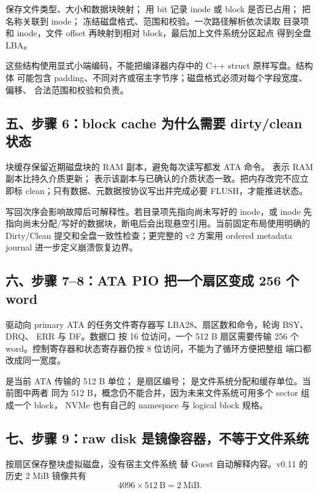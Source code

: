 保存文件类型、大小和数据块映射；
用 bit 记录 inode 或 block 是否已占用；
把名称关联到 inode；
冻结磁盘格式、范围和校验。一次路径解析依次读取
目录项和 inode，文件 offset 再映射到相对 block，最后加上文件系统分区起点
得到全盘 LBA。

这些结构使用显式小端编码，不能把编译器内存中的 C++ struct 原样写盘。结构体
可能包含 padding、不同对齐或宿主字节序；磁盘格式必须对每个字段宽度、偏移、
合法范围和校验和负责。

\subsection{五、步骤 6：block cache 为什么需要 dirty/clean 状态}

块缓存保留近期磁盘块的 RAM 副本，避免每次读写都发 ATA 命令。
表示 RAM 副本比持久介质更新；
表示该副本与已确认的介质状态一致。把内存改完不应立即标
clean；只有数据、元数据按协议写出并完成必要 FLUSH，才能推进状态。

写回次序会影响故障后可解释性。若目录项先指向尚未写好的 inode，或 inode
先指向尚未分配/写好的数据块，断电后会出现悬空引用。当前固定布局使用明确的
Dirty/Clean 提交和全盘一致性检查；更完整的 v2 方案用 ordered metadata
journal 进一步定义崩溃恢复边界。

\subsection{六、步骤 7--8：ATA PIO 把一个扇区变成 256 个 word}

驱动向 primary ATA 的任务文件寄存器写 LBA28、扇区数和命令，轮询 BSY、DRQ、
ERR 与 DF。数据口  按 16 位访问，一个 512 B 扇区需要传输
256 个 word。控制寄存器和状态寄存器仍按 8 位访问，不能为了循环方便把整组
端口都改成同一宽度。

是当前 ATA 传输的 512 B 单位；
是扇区编号；
是文件系统分配和缓存单位。当前图中两者
同为 512 B，概念仍不能合并，因为未来文件系统可用多个 sector 组成一个 block，
NVMe 也有自己的 namespace 与 logical block 规格。

\subsection{七、步骤 9：raw disk 是镜像容器，不等于文件系统}

按扇区保存整块虚拟磁盘，没有宿主文件系统
替 Guest 自动解释内容。v0.11 的历史 2 MiB 镜像共有
\[
4096\times512\ \mathrm{B}=2\ \mathrm{MiB}.
\]

